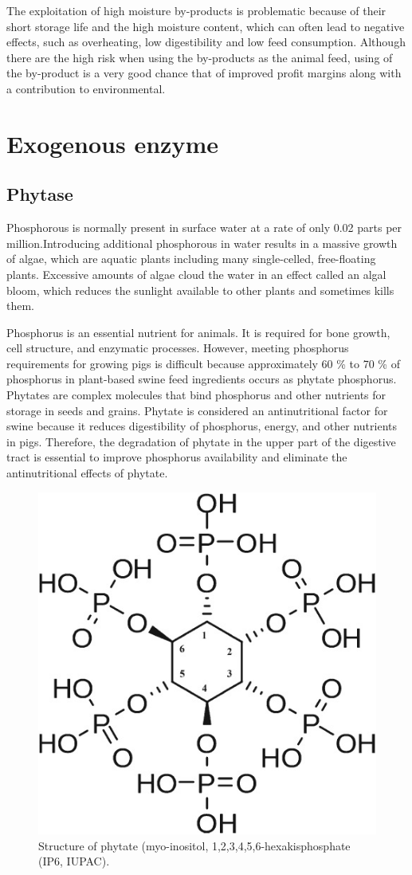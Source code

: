 \documentclass[]{book}
\begin{document}
The exploitation of high moisture by-products is problematic because of their short storage life and the high moisture content, which can often lead to negative effects, such as overheating, low digestibility and low feed consumption. Although there are the high risk when using the by-products as the animal feed, using of the by-product is a very good chance that of improved profit margins along with a contribution to environmental.

\hypertarget{exogenous-enzyme}{%
\section{Exogenous enzyme}\label{exogenous-enzyme}}

\hypertarget{phytase}{%
\subsection{Phytase}\label{phytase}}

Phosphorous is normally present in surface water at a rate of only 0.02 parts per million.Introducing additional phosphorous in water results in a massive growth of algae, which are aquatic plants including many single-celled, free-floating plants. Excessive amounts of algae cloud the water in an effect called an algal bloom, which reduces the sunlight available to other plants and sometimes kills them.

Phosphorus is an essential nutrient for animals. It is required for bone growth, cell structure, and enzymatic processes. However, meeting phosphorus requirements for growing pigs is difficult because approximately 60 \% to 70 \% of phosphorus in plant-based swine feed ingredients occurs as phytate phosphorus. Phytates are complex molecules that bind phosphorus and other nutrients for storage in seeds and grains. Phytate is considered an antinutritional factor for swine because it reduces digestibility of phosphorus, energy, and other nutrients in pigs. Therefore, the degradation of phytate in the upper part of the digestive tract is essential to improve phosphorus availability and eliminate the antinutritional effects of phytate.

\begin{figure}

{\centering \includegraphics[width=0.4\linewidth]{figures/phytate} 

}

\caption{Structure of phytate (myo-inositol, 1,2,3,4,5,6-hexakisphosphate (IP6, IUPAC).}\label{fig:phytate}
\end{figure}
\end{document}
